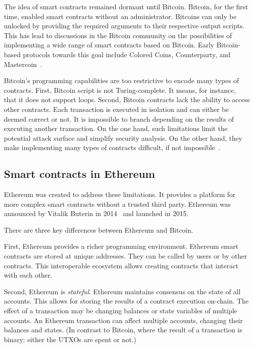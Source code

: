 The idea of smart contracts remained dormant until Bitcoin.
Bitcoin, for the first time, enabled smart contracts without an administrator.
Bitcoins can only be unlocked by providing the required arguments to their respective output scripts.
This has lead to discussions in the Bitcoin community on the possibilities of implementing a wide range of smart contracts based on Bitcoin.
Early Bitcoin-based protocols towards this goal include Colored Coins, Counterparty, and Mastercoin~\cite{Rosenfeld2012,Willett2016,Bartoletti2017a}.

Bitcoin's programming capabilities are too restrictive to encode many types of contracts.
First, Bitcoin script is not Turing-complete.
It means, for instance, that it does not support loops.
Second, Bitcoin contracts lack the ability to access other contracts.
Each transaction is executed in isolation and can either be deemed correct or not.
It is impossible to branch depending on the results of executing another transaction.
On the one hand, such limitations limit the potential attack surface and simplify security analysis.
On the other hand, they make implementing many types of contracts difficult, if not impossible~\cite{Miller2019}.


\subsection{Smart contracts in Ethereum}

Ethereum was created to address these limitations.
It provides a platform for more complex smart contracts without a trusted third party.
Ethereum was announced by Vitalik Buterin in 2014~\cite{Buterin2014, Wood2014} and launched in 2015.

There are three key differences between Ethereum and Bitcoin.

First, Ethereum provides a richer programming environment.
Ethereum smart contracts are stored at unique addresses.
They can be called by users or by other contracts.
This interoperable ecosystem allows creating contracts that interact with each other.

Second, Ethereum is \textit{stateful}.
Ethereum maintains consensus on the state of all accounts.
This allows for storing the results of a contract execution on-chain.
The effect of a transaction may be changing balances or state variables of multiple accounts.
An Ethereum transaction can affect multiple accounts, changing their balances and states.
(In contrast to Bitcoin, where the result of a transaction is binary: either the UTXOs are spent or not.)

